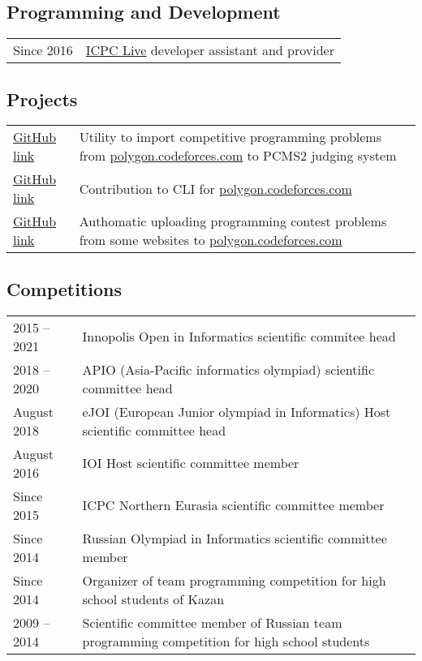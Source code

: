 \documentclass[11pt,a4paper,oneside]{article}
\begin{document}
\subsection{Programming and Development}
  \begin{tabular}{l|p{15 cm}}
    Since 2016 & \href{https://www.youtube.com/channel/UCDBXshZdICEHr0HSVsLrydA}{ICPC Live} developer assistant and provider \\
  \end{tabular}

\subsection{Projects}
  \begin{tabular}{l|p{15cm}}
    \href{https://github.com/ilsaf13/PolygonContestImporter}{GitHub link} & Utility to import competitive programming problems from \href{https://polygon.codeforces.com}{polygon.codeforces.com} to PCMS2 judging system \\
    \href{https://github.com/kunyavskiy/polygon-cli}{GitHub link} & Contribution to CLI for \href{https://polygon.codeforces.com}{polygon.codeforces.com} \\
    \href{https://github.com/niyaznigmatullin/polygon-uploader}{GitHub link} & Authomatic uploading programming contest problems from some websites to \href{https://polygon.codeforces.com}{polygon.codeforces.com} \\
  \end{tabular}


\subsection{Competitions}

\begin{tabular}{l|p{15 cm}}
2015 -- 2021 & Innopolis Open in Informatics scientific commitee head \\
2018 -- 2020 & APIO (Asia-Pacific informatics olympiad) scientific committee head \\
August 2018 & eJOI (European Junior olympiad in Informatics) Host scientific committee head \\
August 2016 & IOI Host scientific committee member \\
Since 2015 & ICPC Northern Eurasia scientific committee member \\
Since 2014 & Russian Olympiad in Informatics scientific committee member \\
Since 2014 & Organizer of team programming competition for high school students of Kazan \\
2009 -- 2014 & Scientific committee member of Russian team programming competition for high school students \\
\end{tabular}
\end{document}
